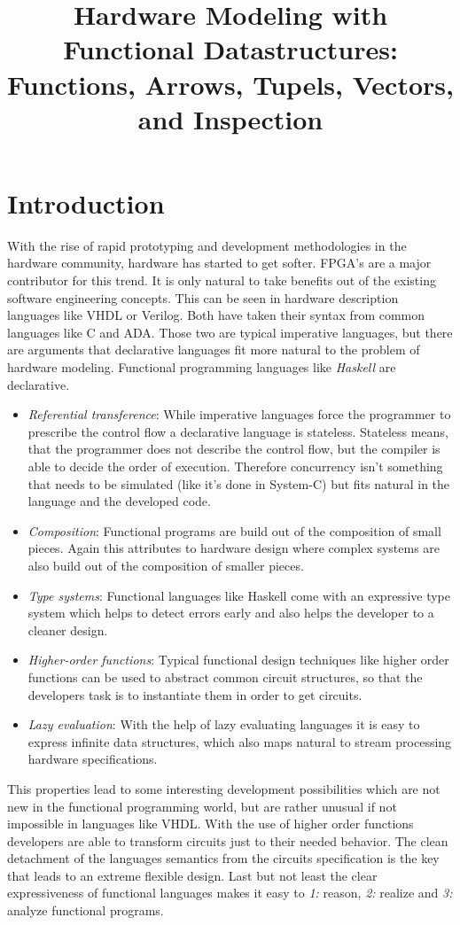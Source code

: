 \documentclass{article}
\title{Hardware Modeling with Functional Datastructures: Functions, Arrows, Tupels, Vectors, and Inspection}
\begin{document}
\section{Introduction}
\label{introduction}
With the rise of rapid prototyping and development methodologies in the hardware community, hardware has started to get softer. FPGA's are a
major contributor for this trend. It is only natural to take benefits out of the existing software engineering concepts. This can be seen in
hardware description languages like VHDL or Verilog. Both have taken their syntax from common languages like C and ADA. Those two are
typical imperative languages, but there are arguments that declarative languages fit more natural to the problem of hardware modeling.
Functional programming languages like \emph{Haskell} are declarative.

\begin{itemize}
  \item \emph{Referential transference}: While imperative languages force the programmer to prescribe the control flow a declarative
    language is stateless. Stateless means, that the programmer does not describe the control flow, but the compiler is able to decide the
    order of execution. Therefore concurrency isn't something that needs to be simulated (like it's done in System-C) but fits natural in
    the language and the developed code.
  \item \emph{Composition}: Functional programs are build out of the composition of small pieces. Again this attributes to hardware design
    where complex systems are also build out of the composition of smaller pieces.
  \item \emph{Type systems}: Functional languages like Haskell come with an expressive type system which helps to detect errors early and
    also helps the developer to a cleaner design.
  \item \emph{Higher-order functions}: Typical functional design techniques like higher order functions can be used to abstract common
    circuit structures, so that the developers task is to instantiate them in order to get circuits.
  \item \emph{Lazy evaluation}: With the help of lazy evaluating languages it is easy to express infinite data structures, which also maps
    natural to stream processing hardware specifications. 
\end{itemize}

This properties lead to some interesting development possibilities which are not new in the functional programming world, but are rather
unusual if not impossible in languages like VHDL. With the use of higher order functions developers are able to transform circuits just to
their needed behavior. The clean detachment of the languages semantics from the circuits specification is the key that leads to an extreme
flexible design. Last but not least the clear expressiveness of functional languages makes it easy to \emph{1:} reason, \emph{2:} realize
and \emph{3:} analyze functional programs. %
\end{document}
